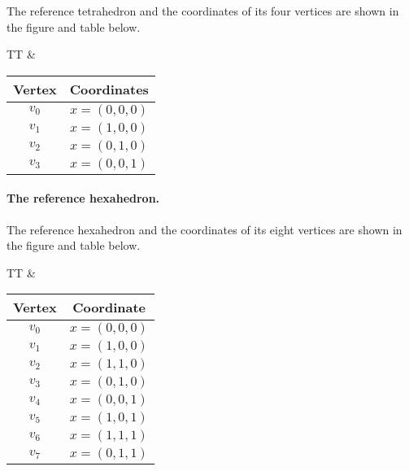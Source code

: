 The reference tetrahedron and the coordinates of its four vertices are
shown in the figure and table below.

\begin{center}
  \begin{tabular}{TT}
    &
    \begin{tabular}{cc}
      \toprule
      Vertex & Coordinates \\
      \hline
      $v_0$ & $x = (0, 0, 0)$ \\
      $v_1$ & $x = (1, 0, 0)$ \\
      $v_2$ & $x = (0, 1, 0)$ \\
      $v_3$ & $x = (0, 0, 1)$ \\
      \bottomrule
    \end{tabular}
  \end{tabular}
\end{center}

\paragraph{The reference hexahedron.}

The reference hexahedron and the coordinates of its eight vertices are
shown in the figure and table below.

\begin{center}
  \begin{tabular}{TT}
    &
    \begin{tabular}{cc}
      \toprule
      Vertex & Coordinate \\
      \hline
      $v_0$ & $x = (0, 0, 0)$ \\
      $v_1$ & $x = (1, 0, 0)$ \\
      $v_2$ & $x = (1, 1, 0)$ \\
      $v_3$ & $x = (0, 1, 0)$ \\
      $v_4$ & $x = (0, 0, 1)$ \\
      $v_5$ & $x = (1, 0, 1)$ \\
      $v_6$ & $x = (1, 1, 1)$ \\
      $v_7$ & $x = (0, 1, 1)$ \\
      \bottomrule
    \end{tabular}
  \end{tabular}
\end{center}
